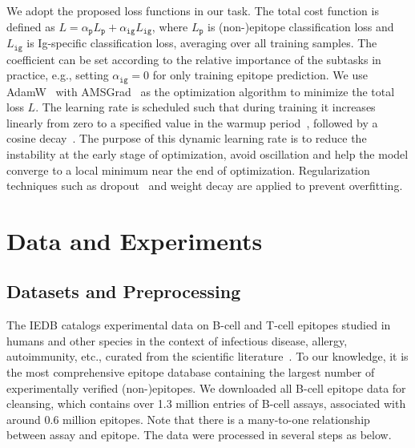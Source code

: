 \documentclass[runningheads]{llncs}
\begin{document}
We adopt the proposed loss functions in our task. The total cost function is defined as $L=\alpha_\mathtt{p}L_\mathtt{p}+\alpha_\mathtt{ig}L_\mathtt{ig}$, where $L_\mathtt{p}$ is (non-)epitope classification loss and $L_\mathtt{ig}$ is Ig-specific classification loss, averaging over all training samples. The coefficient can be set according to the relative importance of the subtasks in practice, e.g., setting $\alpha_\mathtt{ig} = 0$ for only training epitope prediction. We use AdamW~\cite{loshchilov2017decoupled} with AMSGrad~\cite{reddi2018convergence} as the optimization algorithm to minimize the total loss $L$. The learning rate is scheduled such that during training it increases linearly from zero to a specified value in the warmup period~\cite{goyal2017accurate}, followed by a cosine decay~\cite{loshchilov2016sgdr}. The purpose of this dynamic learning rate is to reduce the instability at the early stage of optimization, avoid oscillation and help the model converge to a local minimum near the end of optimization. Regularization techniques such as dropout~\cite{srivastava2014dropout} and weight decay are applied to prevent overfitting.

\section{Data and Experiments}
\subsection{Datasets and Preprocessing}
The IEDB catalogs experimental data on B-cell and T-cell epitopes studied in humans and other species in the context of infectious disease, allergy, autoimmunity, etc., curated from the scientific literature~\cite{vita2019immune}. To our knowledge, it is the most comprehensive epitope database containing the largest number of experimentally verified (non-)epitopes. We downloaded all B-cell epitope data for cleansing, which contains over 1.3 million entries of B-cell assays, associated with around 0.6 million epitopes. Note that there is a many-to-one relationship between assay and epitope. The data were processed in several steps as below.
\end{document}
